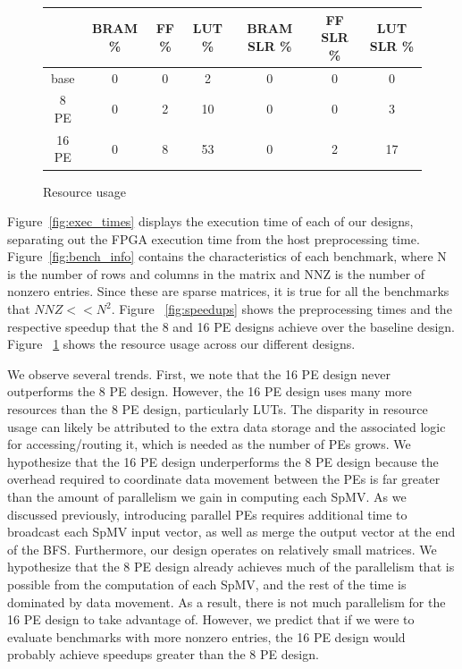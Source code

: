 \documentclass[10pt]{article}
\begin{document}
\begin{figure}[h!]
  \centering
  \begin{tabular} {| c | c | c | c | c | c | c |}
    \hline
          & BRAM \% & FF \% & LUT \% & BRAM SLR \% & FF SLR \% & LUT SLR \% \\
    \hline
    base  & 0 & 0 & 2 & 0 & 0 & 0 \\
    \hline
    8 PE  & 0 & 2 & 10 & 0 & 0 & 3 \\
    \hline
    16 PE & 0 & 8 & 53 & 0 & 2 & 17 \\
    \hline
  \end{tabular}
  \caption{Resource usage}
  \label{fig:resources}
\end{figure}

\noindent Figure~\ref{fig:exec_times} displays the execution time of each of our designs, separating out the FPGA execution time from
the host preprocessing time. Figure~\ref{fig:bench_info} contains the characteristics of each benchmark, where N is the number of
rows and columns in the matrix and NNZ is the number of nonzero entries. Since these are sparse matrices, it is true for all the
benchmarks that $\mathit{NNZ} << N^2$. Figure ~\ref{fig:speedups} shows the preprocessing times and the respective speedup that the 8 and 
16 PE designs achieve over the baseline design. Figure ~\ref{fig:resources} shows the resource usage across our different designs.\newline

\noindent We observe several trends. First, we note that the 16 PE design never outperforms the 8 PE design. However, the 16 PE design
uses many more resources than the 8 PE design, particularly LUTs. The disparity in resource usage can likely be attributed to
the extra data storage and the associated logic for accessing/routing it, which is needed as the number of PEs grows. We hypothesize
that the 16 PE design underperforms the 8 PE design because the overhead required to coordinate data movement between the PEs is far
greater than the amount of parallelism we gain in computing each SpMV. As we discussed previously, introducing parallel PEs requires
additional time to broadcast each SpMV input vector, as well as merge the output vector at the end of the BFS. Furthermore, our
design operates on relatively small matrices. We hypothesize that the 8 PE design already achieves much of the parallelism that is
possible from the computation of each SpMV, and the rest of the time is dominated by data movement. As a result, there is not
much parallelism for the 16 PE design to take advantage of. However, we predict that if we were to evaluate benchmarks with more
nonzero entries, the 16 PE design would probably achieve speedups greater than the 8 PE design.\newline
\end{document}
